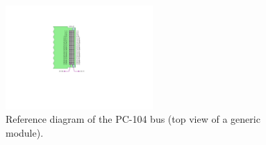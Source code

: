 \begin{figure}[!ht]
    \begin{center}
        \includegraphics[width=0.5\textwidth]{figures/pc104-diagram}
        \caption{Reference diagram of the PC-104 bus (top view of a generic module).}
        \label{fig:pc104-ref-diagram}
    \end{center}
\end{figure}

